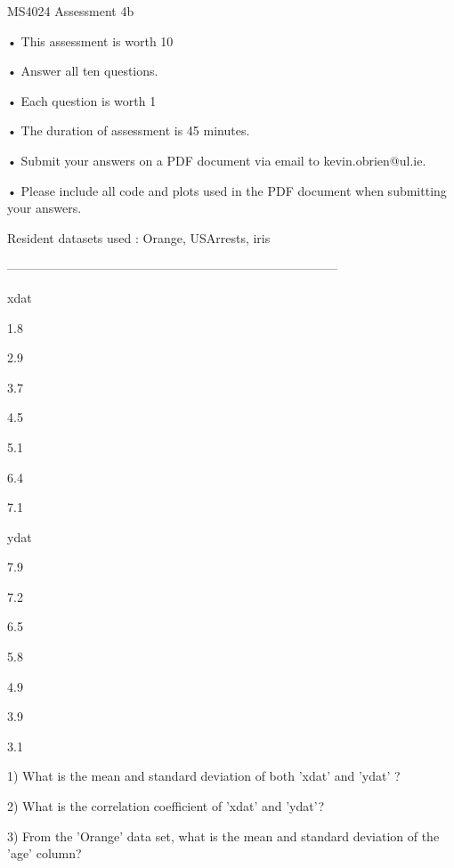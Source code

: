 
MS4024 Assessment 4b   

 
•
This assessment is worth 10%

•
Answer all ten questions. 

•
Each question is worth 1%

•
The duration of assessment is 45 minutes.

•
Submit your answers on a PDF document via email to kevin.obrien@ul.ie.

•
Please include all code and plots used in the PDF document when submitting your answers.


 

Resident datasets used : Orange, USArrests, iris

 



--------------------------------------------------------------------------------


 















xdat
 

1.8
 

2.9
 

3.7
 

4.5
 

5.1
 

6.4
 

7.1
 



ydat
 

7.9
 

7.2
 

6.5
 

5.8
 

4.9
 

3.9
 

3.1
 

 

1) What is the mean and standard deviation of both 'xdat' and 'ydat' ?

 

2) What is the correlation coefficient of 'xdat' and 'ydat'?

 

3) From the 'Orange' data set, what is the mean and standard deviation of the 'age' column?

 

